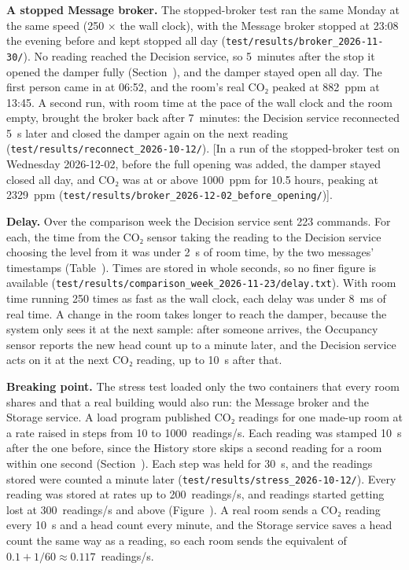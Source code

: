 \documentclass[11pt]{article}
\def\ref#1{\getrefnumber{#1}}%
\begin{document}
\textbf{A stopped Message broker.} The stopped-broker test ran the same
Monday at the same speed (250 $\times$ the wall
clock), with the Message broker stopped at 23:08
the evening before and kept stopped all day
(\texttt{test/results/\allowbreak broker\_2026-11-30/}). No reading
reached the Decision service, so 5~minutes after the stop it opened the
damper fully (Section~\ref{sec:decision-logic}), and the damper stayed
open all day. The first person came in at 06:52, and the room's real
CO₂ peaked at 882~ppm at 13:45. A second run, with room time at the pace
of the wall clock and the room empty, brought the broker back after 7~minutes: the Decision service
reconnected 5~s later and closed the damper again on the next reading
(\texttt{test/results/\allowbreak reconnect\_2026-10-12/}). [In a run of
the stopped-broker test on Wednesday 2026-12-02, before the full opening was added, the damper stayed closed all day, and CO₂ was at or
above 1000~ppm for 10.5 hours, peaking at 2329~ppm
(\texttt{test/results/\allowbreak broker\_2026-12-02\_before\_opening/})].

\textbf{Delay.} Over the comparison week the Decision service sent 223
commands. For each, the time from the CO₂ sensor taking the reading to
the Decision service choosing the level from it was under 2~s of room
time, by the two messages' timestamps (Table~\ref{tab:fields}). Times are
stored in whole seconds, so no finer figure is available
(\texttt{test/results/\allowbreak comparison\_week\_2026-11-23/\allowbreak delay.txt}).
With room time running 250 times as fast as the wall clock, each delay
was under 8~ms of real time. A change in the room takes longer to reach the
damper, because the system only sees it at the next sample: after
someone arrives, the Occupancy sensor reports the new head count up to
a minute later, and the Decision service acts on it at the next CO₂
reading, up to 10~s after that.

\textbf{Breaking point.} The stress test loaded only the two containers that
every room shares and that a real building would also run: the Message
broker and the Storage service. A load program published CO₂ readings for one made-up room at a rate
raised in steps from 10 to 1000~readings/s. Each reading was stamped
10~s after the one before, since the History store skips a second
reading for a room within one second (Section~\ref{sec:pipeline}). Each step was held for 30~s, and the readings stored
were counted a minute later
(\texttt{test/results/\allowbreak stress\_2026-10-12/}).
Every reading was stored at rates up to 200~readings/s, and readings
started getting lost at 300~readings/s and above (Figure~\ref{fig:stress}). A
real room sends a CO₂ reading every 10~s and a head count every minute,
and the Storage service saves a head count the same way as a reading,
so each room sends the equivalent of $0.1 + 1/60 \approx
0.117$~readings/s.
\end{document}

